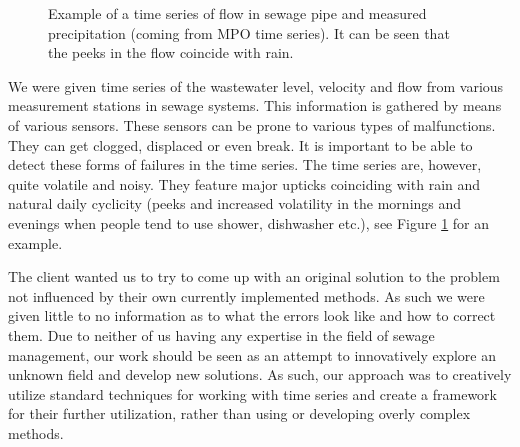 \documentclass[12pt,a4paper]{article}
\begin{document}
\begin{figure}[ht]
  \noindent{}
  \caption{Example of a time series of flow in sewage pipe and measured precipitation (coming from MPO time series). It can be seen that the peeks in the flow coincide with rain.}
    \label{rain_data}
\end{figure}


We were given time series of the wastewater level, velocity and flow from various measurement stations in  sewage systems. This information is gathered by means of various sensors. These sensors can be prone to various types of malfunctions. They can get clogged, displaced or even break. It is important to be able to detect these forms of failures in the time series. The time series are, however, quite  volatile and noisy. They feature major upticks  coinciding with rain and natural daily cyclicity (peeks and increased volatility in the mornings and evenings when people tend to use shower, dishwasher etc.), see Figure \ref{rain_data} for an example.

The client wanted us to try to come up with an original solution to the problem not influenced by their own currently implemented methods. As such we were given little to no information as to what the errors look like and how to correct them. Due to neither of us having any expertise in the field of sewage management, our work should be seen as an attempt to innovatively explore an unknown field and develop new solutions. As such, our approach was to creatively utilize standard techniques for working with time series and create a framework for their further utilization, rather than using or developing overly complex methods.
\end{document}
